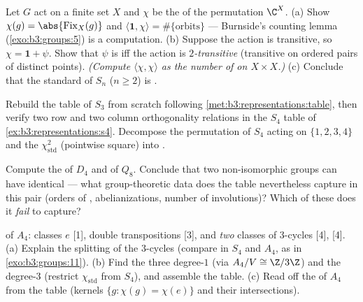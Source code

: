\begin{exercise}[$\star$]\label{exo:b3:representations:2}
Let $G$ act on a finite set $X$ and $\chi$ be the  of
the permutation  $\C^X$.
(a) Show $\chi(g) = \abs{\operatorname{Fix}_X(g)}$ and
$\langle \mathbf 1, \chi\rangle = \#\{\text{orbits}\}$ ---
Burnside's counting lemma (\cref{exo:b3:groups:5}) is a 
computation.
(b) Suppose the action is transitive, so $\chi = \mathbf 1 +
\psi$. Show that $\psi$ is  iff the action is
\emph{$2$-transitive} (transitive on ordered pairs of distinct
points). \emph{(Compute $\langle\chi,\chi\rangle$ as the number
of  on $X \times X$.)}
(c) Conclude that the standard  of $S_n$ ($n \geq
2$) is .
\end{exercise}

\begin{exercise}[$\star$]\label{exo:b3:representations:3}
Rebuild the table of $S_3$ from scratch following
\cref{met:b3:representations:table}, then verify two row and two
column orthogonality relations in the $S_4$ table of
\cref{ex:b3:representations:s4}. Decompose the permutation
 of $S_4$ acting on $\{1,2,3,4\}$ and the 
$\chi_{\mathrm{std}}^2$ (pointwise square) into .
\end{exercise}

\begin{exercise}[$\star\star$]\label{exo:b3:representations:4}
Compute the  of $D_4$ and of $Q_8$. Conclude
that two non-isomorphic groups can have identical  --- what group-theoretic data does the table nevertheless
capture in this pair (orders of , abelianizations,
number of involutions)? Which of these does it \emph{fail} to
capture?
\end{exercise}

\begin{exercise}[$\star\star$]\label{exo:b3:representations:5}
 of $A_4$: classes $e$ [1], double transpositions
[3], and \emph{two} classes of $3$-cycles [4], [4].
(a) Explain the splitting of the $3$-cycles (compare 
in $S_4$ and $A_4$, as in \cref{exo:b3:groups:11}).
(b) Find the three degree-$1$  (via $A_4/V \cong
\Z/3\Z$) and the degree-$3$  (restrict
$\chi_{\mathrm{std}}$ from $S_4$), and assemble the table.
(c) Read off the  of $A_4$ from the table
(kernels $\{g : \chi(g) = \chi(e)\}$ and their intersections).
\end{exercise}

